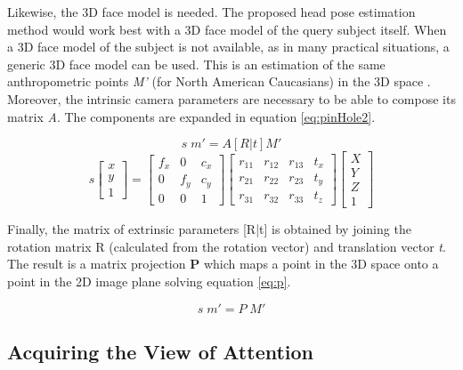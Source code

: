 \documentclass{sig-alternate}
\begin{document}
Likewise, the 3D face model is needed. The proposed head pose estimation method
would work best with a 3D face model of the query subject itself. When a 3D face
model of the subject is not available, as in many practical situations, a
generic 3D face model can be used. This is an estimation of the same
anthropometric points \textit{M'} (for North American Caucasians) in the 3D
space \cite{farkas1994anthropometry}. Moreover, the intrinsic camera parameters
are necessary to be able to compose its matrix \textit{A}. The components are
expanded in equation \ref{eq:pinHole2}.	

\begin{equation}
s  \; m' = A [R|t] M'
\label{eq:pinHole}
\end{equation}
\begin{equation}
s
\begin{bmatrix}
x \\
y \\
1
\end{bmatrix}
=
\begin{bmatrix}
f_x & 0 & c_x  \\
0 & f_y & c_y  \\
0 & 0 & 1 
\end{bmatrix}
\begin{bmatrix}
r_{11} & r_{12} & r_{13} & t_x  \\
r_{21} & r_{22} & r_{23} & t_y  \\
r_{31} & r_{32} & r_{33} & t_z  
\end{bmatrix}
\begin{bmatrix}
X \\
Y \\
Z \\
1
\end{bmatrix}
\label{eq:pinHole2}
\end{equation}

Finally, the matrix of extrinsic parameters [R|t] is obtained by joining the
rotation matrix R (calculated from the rotation vector) and translation vector
\textit{t}. The result is a matrix projection \textbf{P} which maps a point in
the 3D space onto a point in the 2D image plane solving equation \ref{eq:p}.

\begin{equation}
s  \; m' = P \; M'
\label{eq:p}
\end{equation}

\subsection{Acquiring the View of Attention}
\end{document}
